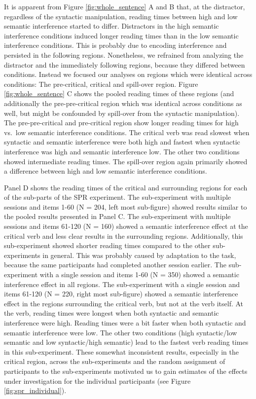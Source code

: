 \documentclass[a4paper, man, floatsintext]{apa7}
\begin{document}
It is apparent from Figure \ref{fig:whole_sentence} A and B that, at the distractor, regardless of the syntactic manipulation, reading times between high and low semantic interference started to differ. Distractors in the high semantic interference conditions induced longer reading times than in the low semantic interference conditions. This is probably due to encoding interference \citep{mertzen, jaeger_etal_2015_retrieval_encoding} and persisted in the following regions. Nonetheless, we refrained from analyzing the distractor and the immediately following regions, because they differed between conditions. Instead we focused our analyses on regions which were identical across conditions: The pre-critical, critical and spill-over region. Figure \ref{fig:whole_sentence} C shows the pooled reading times of these regions (and additionally the pre-pre-critical region which was identical across conditions as well, but might be confounded by spill-over from the syntactic manipulation). The pre-pre-critical and pre-critical region show longer reading times for high vs.\ low semantic interference conditions. The critical verb was read slowest when syntactic and semantic interference were both high and fastest when syntactic interference was high and semantic interference low. The other two conditions showed intermediate reading times. The spill-over region again primarily showed a difference between high and low semantic interference conditions. 

Panel D shows the reading times of the critical and surrounding regions for each of the sub-parts of the SPR experiment. The sub-experiment with multiple sessions and items 1-60 (N = 204, left most sub-figure) showed results similar to the pooled results presented in Panel C. The sub-experiment with multiple sessions and items 61-120 (N = 160) showed a semantic interference effect at the critical verb and less clear results in the surrounding regions. Additionally, this sub-experiment showed shorter reading times compared to the other sub-experiments in general. This was probably caused by adaptation to the task, because the same participants had completed another session earlier. The sub-experiment with a single session and items 1-60 (N = 350) showed a semantic interference effect in all regions. The sub-experiment with a single session and items 61-120 (N = 220, right most sub-figure) showed a semantic interference effect in the regions surrounding the critical verb, but not at the verb itself. At the verb, reading times were longest when both syntactic and semantic interference were high. Reading times were a bit faster when both syntactic and semantic interference were low. The other two conditions (high syntactic/low semantic and low syntactic/high semantic) lead to the fastest verb reading times in this sub-experiment. These somewhat inconsistent results, especially in the critical region, across the sub-experiments and the random assignment of participants to the sub-experiments motivated us to gain estimates of the effects under investigation for the individual participants (see Figure \ref{fig:spr_individual}).
\end{document}

